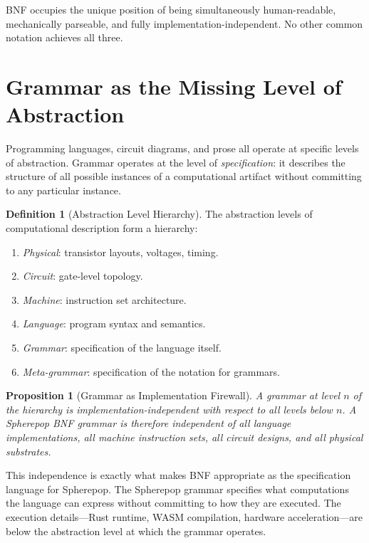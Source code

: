 \documentclass[12pt, a4paper, openany]{book}
\theoremstyle{plain}
\newtheorem{proposition}[theorem]{Proposition}
\theoremstyle{definition}
\newtheorem{definition}[theorem]{Definition}
\theoremstyle{remark}
\begin{document}
BNF occupies the unique position of being simultaneously human-readable,
mechanically parseable, and fully implementation-independent. No other common
notation achieves all three.

\section{Grammar as the Missing Level of Abstraction}

Programming languages, circuit diagrams, and prose all operate at specific
levels of abstraction. Grammar operates at the level of \emph{specification}:
it describes the structure of all possible instances of a computational artifact
without committing to any particular instance.

\begin{definition}[Abstraction Level Hierarchy]
The abstraction levels of computational description form a hierarchy:
\begin{enumerate}
\item \emph{Physical}: transistor layouts, voltages, timing.
\item \emph{Circuit}: gate-level topology.
\item \emph{Machine}: instruction set architecture.
\item \emph{Language}: program syntax and semantics.
\item \emph{Grammar}: specification of the language itself.
\item \emph{Meta-grammar}: specification of the notation for grammars.
\end{enumerate}
\end{definition}

\begin{proposition}[Grammar as Implementation Firewall]
A grammar at level $n$ of the hierarchy is implementation-independent with
respect to all levels below $n$. A Spherepop BNF grammar is therefore
independent of all language implementations, all machine instruction sets, all
circuit designs, and all physical substrates.
\end{proposition}

This independence is exactly what makes BNF appropriate as the specification
language for Spherepop. The Spherepop grammar specifies what computations the
language can express without committing to how they are executed. The execution
details---Rust runtime, WASM compilation, hardware acceleration---are below the
abstraction level at which the grammar operates.
\end{document}
